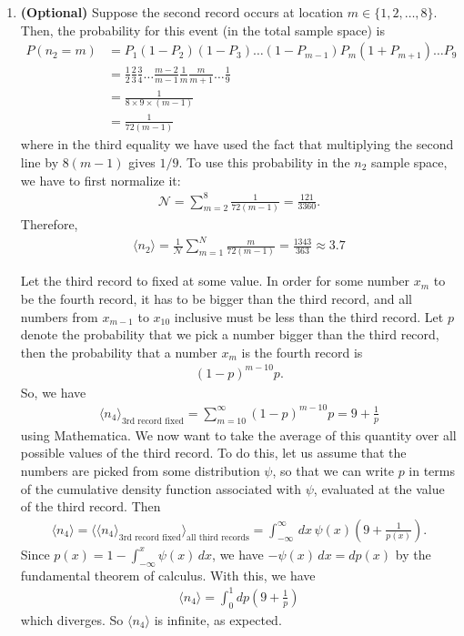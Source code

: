 \documentclass{article}
\theoremstyle{definition}
\newcommand{\f}[2]{\frac{#1}{#2}}
\newcommand{\lp}{\left(}
\newcommand{\rp}{\right)}
\begin{document}
\begin{enumerate}[label=(\alph*)]
	
	
	\item \textbf{(Optional)} Suppose the second record occurs at location $m \in \{1,2,\dots,8\}$. Then, the probability for this event (in the total sample space) is 
	\begin{align*}
	P(n_2 = m) &=  P_1 (1-P_2)(1-P_3)\dots (1-P_{m-1})P_m (1+P_{m+1}) \dots P_9 \\
	&= \f{1}{2}\f{2}{3}\f{3}{4}\dots \f{m-2}{m-1}\f{1}{m}\f{m}{m+1}\dots\f{1}{9}\\
	&= \f{1}{8\times 9\times (m-1)}\\
	&= \f{1}{72(m-1)}
	\end{align*}
	where in the third equality we have used the fact that multiplying the second line by $8(m-1)$ gives $1/9$. To use this probability in the $n_2$ sample space, we have to first normalize it:
	\begin{align*}
	\mathcal{N} = \sum^8_{m=2}\f{1}{72(m-1)} = \f{121}{3360}.
	\end{align*}
	Therefore,
	\begin{align*}
	\boxed{\langle{n_2}\rangle} = \f{1}{\mathcal{N}}\sum^N_{m=1} \f{m}{72(m-1)} =  \f{1343}{363}\approx \boxed{3.7}
	\end{align*}
	
	Let the third record to fixed at some value. In order for some number $x_m$ to be the fourth record, it has to be bigger than the third record, and all numbers from $x_{m-1}$ to $x_{10}$ inclusive must be less than the third record. Let $p$ denote the probability that we pick a number bigger than the third record, then the probability that a number $x_m$ is the fourth record is 
	\begin{align*}
	(1-p)^{m-10}p. 
	\end{align*}
	So, we have
	\begin{align*}
	\langle n_4 \rangle_\text{3rd record fixed} = \sum^\infty_{m=10}   (1-p)^{m-10}p = 9 + \f{1}{p}
	\end{align*}
	using Mathematica. We now want to take the average of this quantity over all possible values of the third record. To do this, let us assume that the numbers are picked from some distribution $\psi$, so that we can write $p$ in terms of the cumulative density function associated with $\psi$, evaluated at the value of the third record. Then 
	\begin{align*}
	\langle n_4 \rangle = \langle  \langle n_4 \rangle_\text{3rd record fixed} \rangle_\text{all third records} = \int_{-\infty}^\infty \,dx\,\psi(x)\lp 9 + \f{1}{p(x)} \rp.
	\end{align*}
	Since $p(x) = 1-\int_{-\infty}^x \psi(x)\,dx$, we have $-\psi(x)\,dx = dp(x)$ by the fundamental theorem of calculus. With this, we have
	\begin{align*}
	\langle n_4 \rangle = \int^1_0 dp\lp 9 + \f{1}{p} \rp 
	\end{align*}
	which diverges. So $\langle n_4 \rangle$ is infinite, as expected. 
	
\end{enumerate}
\end{document}
